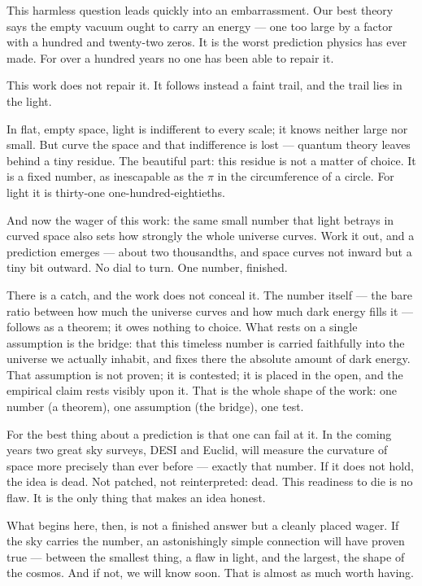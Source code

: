 \documentclass[11pt,a4paper]{article}
\theoremstyle{definition}
\theoremstyle{remark}
\begin{document}
This harmless question leads quickly into an embarrassment. Our best theory says the empty vacuum
ought to carry an energy --- one too large by a factor with a hundred and twenty-two zeros. It is
the worst prediction physics has ever made. For over a hundred years no one has been able to
repair it.

This work does not repair it. It follows instead a faint trail, and the trail lies in the light.

In flat, empty space, light is indifferent to every scale; it knows neither large nor small. But
curve the space and that indifference is lost --- quantum theory leaves behind a tiny residue. The
beautiful part: this residue is not a matter of choice. It is a fixed number, as inescapable as the
$\pi$ in the circumference of a circle. For light it is thirty-one one-hundred-eightieths.

And now the wager of this work: the same small number that light betrays in curved space also sets
how strongly the whole universe curves. Work it out, and a prediction emerges --- about two
thousandths, and space curves not inward but a tiny bit outward. No dial to turn. One number,
finished.

There is a catch, and the work does not conceal it. The number itself --- the bare ratio between
how much the universe curves and how much dark energy fills it --- follows as a theorem; it owes
nothing to choice. What rests on a single assumption is the bridge: that this timeless number is
carried faithfully into the universe we actually inhabit, and fixes there the absolute amount of
dark energy. That assumption is not proven; it is contested; it is placed in the open, and the
empirical claim rests visibly upon it. That is the whole shape of the work: one number (a theorem),
one assumption (the bridge), one test.

For the best thing about a prediction is that one can fail at it. In the coming years two great sky
surveys, DESI and Euclid, will measure the curvature of space more precisely than ever before ---
exactly that number. If it does not hold, the idea is dead. Not patched, not reinterpreted: dead.
This readiness to die is no flaw. It is the only thing that makes an idea honest.

What begins here, then, is not a finished answer but a cleanly placed wager. If the sky carries the
number, an astonishingly simple connection will have proven true --- between the smallest thing, a
flaw in light, and the largest, the shape of the cosmos. And if not, we will know soon. That is
almost as much worth having.
\end{document}
